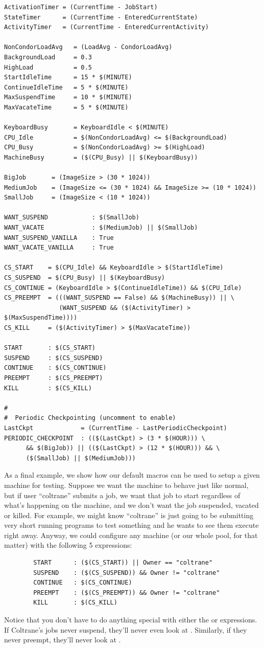 \begin{verbatim}
ActivationTimer = (CurrentTime - JobStart)
StateTimer      = (CurrentTime - EnteredCurrentState)
ActivityTimer   = (CurrentTime - EnteredCurrentActivity)

NonCondorLoadAvg   = (LoadAvg - CondorLoadAvg)
BackgroundLoad     = 0.3
HighLoad           = 0.5
StartIdleTime      = 15 * $(MINUTE)
ContinueIdleTime   = 5 * $(MINUTE)
MaxSuspendTime     = 10 * $(MINUTE)
MaxVacateTime      = 5 * $(MINUTE)

KeyboardBusy       = KeyboardIdle < $(MINUTE)
CPU_Idle           = $(NonCondorLoadAvg) <= $(BackgroundLoad)
CPU_Busy           = $(NonCondorLoadAvg) >= $(HighLoad)
MachineBusy        = ($(CPU_Busy) || $(KeyboardBusy))

BigJob       = (ImageSize > (30 * 1024))
MediumJob    = (ImageSize <= (30 * 1024) && ImageSize >= (10 * 1024))
SmallJob     = (ImageSize < (10 * 1024))

WANT_SUSPEND            : $(SmallJob)
WANT_VACATE             : $(MediumJob) || $(SmallJob)
WANT_SUSPEND_VANILLA    : True
WANT_VACATE_VANILLA     : True

CS_START    = $(CPU_Idle) && KeyboardIdle > $(StartIdleTime)
CS_SUSPEND  = $(CPU_Busy) || $(KeyboardBusy)
CS_CONTINUE = (KeyboardIdle > $(ContinueIdleTime)) && $(CPU_Idle)
CS_PREEMPT  = (((WANT_SUSPEND == False) && $(MachineBusy)) || \
               (WANT_SUSPEND && ($(ActivityTimer) > $(MaxSuspendTime))))
CS_KILL     = ($(ActivityTimer) > $(MaxVacateTime))

START       : $(CS_START)
SUSPEND     : $(CS_SUSPEND)
CONTINUE    : $(CS_CONTINUE)
PREEMPT     : $(CS_PREEMPT)
KILL        : $(CS_KILL)

#
#  Periodic Checkpointing (uncomment to enable)
LastCkpt             = (CurrentTime - LastPeriodicCheckpoint)
PERIODIC_CHECKPOINT  : (($(LastCkpt) > (3 * $(HOUR))) \
      && $(BigJob)) || (($(LastCkpt) > (12 * $(HOUR))) && \
      ($(SmallJob) || $(MediumJob)))
\end{verbatim}

As a final example, we show how our default macros can be used to
setup a given machine for testing.  Suppose we want the machine to
behave just like normal, but if user ``coltrane'' submits a job, we
want that job to start regardless of what's happening on the machine,
and we don't want the job suspended, vacated or killed.  For example,
we might know ``coltrane'' is just going to be submitting very short
running programs to test something and he wants to see them execute
right away.  Anyway, we could configure any machine (or our whole
pool, for that matter) with the following 5 expressions:
\begin{verbatim}
        START      : ($(CS_START)) || Owner == "coltrane"
        SUSPEND    : ($(CS_SUSPEND)) && Owner != "coltrane"
        CONTINUE   : $(CS_CONTINUE)
        PREEMPT    : ($(CS_PREEMPT)) && Owner != "coltrane"
        KILL       : $(CS_KILL)
\end{verbatim}
Notice that you don't have to do anything special with either the
\Expr{CONTINUE} or  expressions.
If Coltrane's jobs never suspend, they'll never even look at
\Expr{CONTINE}.  
Similarly, if they never preempt, they'll never look at \Expr{KILL}. 


